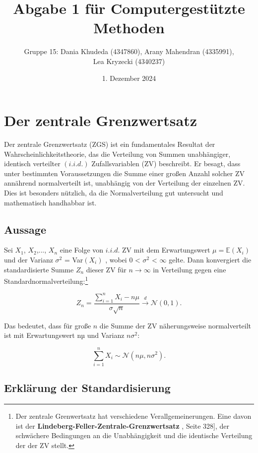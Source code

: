 \documentclass{article}
\title{Abgabe 1 für Computergestützte Methoden}
\author{Gruppe 15: Dania Khudeda (4347860), Arany Mahendran (4335991), \\
Lea Kryzecki (4340237)}
\date{1. Dezember 2024}
\begin{document}
\maketitle 
\tableofcontents
\newpage
\section{Der zentrale Grenzwertsatz}

Der zentrale Grenzwertsatz (ZGS) ist ein fundamentales Resultat der Wahrscheinlichkeitstheorie, das die Verteilung von Summen unabhängiger, identisch verteilter $(i.i.d.)$ Zufallsvariablen (ZV) beschreibt. 
Er besagt, dass unter bestimmten Voraussetzungen die Summe einer großen Anzahl solcher ZV annährend normalverteilt ist, unabhängig von der Verteilung der einzelnen ZV. Dies ist besonders nützlich, da die Normalverteilung gut untersucht und mathematisch handhabbar ist.

\subsection{Aussage}

Sei $X_1$, $X_2$,..., $X_n$ eine Folge von $i.i.d.$ ZV mit dem Erwartungswert $\mu = \mathbb{E}(X_i)$ und der Varianz $\sigma^2$ = Var$(X_i)$ , wobei 0 < $\sigma^2$ < $\infty$ gelte. Dann konvergiert die standardisierte Summe $Z_n$ dieser ZV für ${n \to \infty}$ in Verteilung gegen eine Standardnormalverteilung:\footnote[1]{Der zentrale Grenwertsatz hat verschiedene Verallgemeinerungen. Eine davon ist der \textbf{Lindeberg-Feller-Zentrale-Grenzwertsatz} \cite{buch}, Seite 328], der schwächere Bedingungen an die Unabhängigkeit und die identische Verteilung der der ZV stellt.}

 \begin{equation}
 \label{eq: sum}
     Z_n = \frac{\sum_{i=1}^{n} X_i - n\mu}  {\sigma\sqrt{n}}\overset{d}\to \mathcal{N}(0,1). 
 \end{equation}


Das bedeutet, dass für große $n$ die Summe der ZV näherungsweise normalverteilt ist mit Erwartungswert nµ und Varianz $n\sigma^2$: 

\begin{equation}
    \label{eq: sum1}
 \sum_{i=1}^{n} X_i \sim\mathcal{N}(n\mu, n\sigma^2).
\end{equation}

\subsection{Erklärung der Standardisierung}
\end{document}
